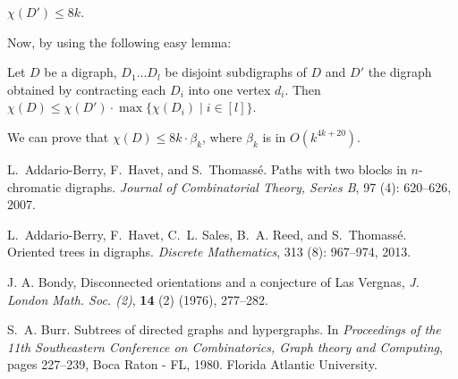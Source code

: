 \documentclass{endm}
\begin{document}
\begin{claim}\label{cl:nocycle}
$\chi(D') \leq 8k$.
\end{claim} 

Now, by using the following easy lemma:

\begin{lemma}\label{lem:contrac}
Let $D$ be a digraph, $D_1 \dots D_l$ be disjoint subdigraphs of $D$ and $D'$ the digraph obtained by contracting each $D_i$ into
one vertex $d_i$. Then $\chi(D) \leq \chi(D')\cdot \max\{\chi(D_i) \mid i \in [l]\}$.
\end{lemma}

We can prove that $\chi(D) \leq 8k \cdot \beta_k$, where $\beta_k$ is in $O(k^{4k+20})$.

\begin{thebibliography}{10}\label{bibliography}


L.~Addario-Berry, F.~Havet, and S.~Thomass{\'e}.
\newblock Paths with two blocks in $n$-chromatic digraphs.
\newblock \emph{Journal of Combinatorial Theory, Series B}, 97
  (4): 620--626, 2007.

L.~Addario-Berry, F.~Havet, C.~L. Sales, B.~A. Reed, and S.~Thomass{\'e}.
\newblock Oriented trees in digraphs.
\newblock \emph{Discrete Mathematics}, 313 (8): 967--974,
  2013.



    J. A. Bondy, Disconnected orientations and a conjecture of Las Vergnas,
{\it J. London Math. Soc. (2)}, {\bf 14} (2) (1976), 277--282.

%



S.~A. Burr.
\newblock Subtrees of directed graphs and hypergraphs.
\newblock In \emph{Proceedings of the 11th Southeastern Conference on
  Combinatorics, Graph theory and Computing}, pages 227--239, Boca Raton - FL,
  1980. Florida Atlantic University.


\end{thebibliography}
\end{document}
